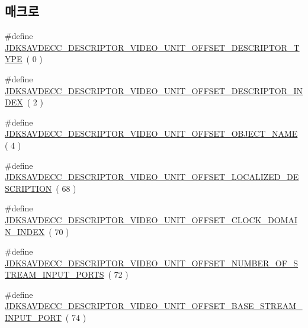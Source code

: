 \subsection*{매크로}
\begin{DoxyCompactItemize}
\item 
\#define \hyperlink{group__descriptor__video_gacf0472d6580f207c6632bc95bd118da9}{J\+D\+K\+S\+A\+V\+D\+E\+C\+C\+\_\+\+D\+E\+S\+C\+R\+I\+P\+T\+O\+R\+\_\+\+V\+I\+D\+E\+O\+\_\+\+U\+N\+I\+T\+\_\+\+O\+F\+F\+S\+E\+T\+\_\+\+D\+E\+S\+C\+R\+I\+P\+T\+O\+R\+\_\+\+T\+Y\+PE}~( 0 )
\item 
\#define \hyperlink{group__descriptor__video_gab7769790431c6ebabe878ce53d7dbaf4}{J\+D\+K\+S\+A\+V\+D\+E\+C\+C\+\_\+\+D\+E\+S\+C\+R\+I\+P\+T\+O\+R\+\_\+\+V\+I\+D\+E\+O\+\_\+\+U\+N\+I\+T\+\_\+\+O\+F\+F\+S\+E\+T\+\_\+\+D\+E\+S\+C\+R\+I\+P\+T\+O\+R\+\_\+\+I\+N\+D\+EX}~( 2 )
\item 
\#define \hyperlink{group__descriptor__video_gabfbf3b3eeab11c73ca770caa295c470c}{J\+D\+K\+S\+A\+V\+D\+E\+C\+C\+\_\+\+D\+E\+S\+C\+R\+I\+P\+T\+O\+R\+\_\+\+V\+I\+D\+E\+O\+\_\+\+U\+N\+I\+T\+\_\+\+O\+F\+F\+S\+E\+T\+\_\+\+O\+B\+J\+E\+C\+T\+\_\+\+N\+A\+ME}~( 4 )
\item 
\#define \hyperlink{group__descriptor__video_gaa4afc9b13d38517d89696e708ce5855f}{J\+D\+K\+S\+A\+V\+D\+E\+C\+C\+\_\+\+D\+E\+S\+C\+R\+I\+P\+T\+O\+R\+\_\+\+V\+I\+D\+E\+O\+\_\+\+U\+N\+I\+T\+\_\+\+O\+F\+F\+S\+E\+T\+\_\+\+L\+O\+C\+A\+L\+I\+Z\+E\+D\+\_\+\+D\+E\+S\+C\+R\+I\+P\+T\+I\+ON}~( 68 )
\item 
\#define \hyperlink{group__descriptor__video_ga1ab482a9dd1e08a3d89c963f8d3705b3}{J\+D\+K\+S\+A\+V\+D\+E\+C\+C\+\_\+\+D\+E\+S\+C\+R\+I\+P\+T\+O\+R\+\_\+\+V\+I\+D\+E\+O\+\_\+\+U\+N\+I\+T\+\_\+\+O\+F\+F\+S\+E\+T\+\_\+\+C\+L\+O\+C\+K\+\_\+\+D\+O\+M\+A\+I\+N\+\_\+\+I\+N\+D\+EX}~( 70 )
\item 
\#define \hyperlink{group__descriptor__video_gacae217eeafe4e19e6bdbd5ba173eccf4}{J\+D\+K\+S\+A\+V\+D\+E\+C\+C\+\_\+\+D\+E\+S\+C\+R\+I\+P\+T\+O\+R\+\_\+\+V\+I\+D\+E\+O\+\_\+\+U\+N\+I\+T\+\_\+\+O\+F\+F\+S\+E\+T\+\_\+\+N\+U\+M\+B\+E\+R\+\_\+\+O\+F\+\_\+\+S\+T\+R\+E\+A\+M\+\_\+\+I\+N\+P\+U\+T\+\_\+\+P\+O\+R\+TS}~( 72 )
\item 
\#define \hyperlink{group__descriptor__video_gab2fde4b1b865b4c7e5f242586ac5465f}{J\+D\+K\+S\+A\+V\+D\+E\+C\+C\+\_\+\+D\+E\+S\+C\+R\+I\+P\+T\+O\+R\+\_\+\+V\+I\+D\+E\+O\+\_\+\+U\+N\+I\+T\+\_\+\+O\+F\+F\+S\+E\+T\+\_\+\+B\+A\+S\+E\+\_\+\+S\+T\+R\+E\+A\+M\+\_\+\+I\+N\+P\+U\+T\+\_\+\+P\+O\+RT}~( 74 )
\item 

\end{DoxyCompactItemize}
